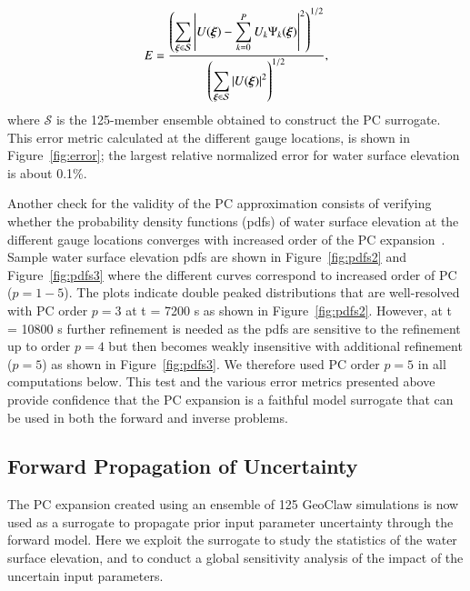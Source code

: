 \documentclass[review,12pt]{elsarticle}
\newcommand{\xxi}{\vec{\xi}}
\newcommand{\NISP}{\mathcal{S}}
\renewcommand{\vec}[1]{{\mathchoice
                     {\mbox{\boldmath$\displaystyle{#1}$}}
                     {\mbox{\boldmath$\textstyle{#1}$}}
                     {\mbox{\boldmath$\scriptstyle{#1}$}}
                     {\mbox{\boldmath$\scriptscriptstyle{#1}$}}}}
\newcommand{\geoclaw}{{\sc GeoClaw}\xspace}
\begin{document}
\begin{equation} 
   E = \frac{\displaystyle
         \left(\sum_{\xxi \in \NISP} \left|U(\xxi) - \sum_{k = 0}^{P}
U_k\Psi_k(\xxi)\right|^2
         \right)^{1/2}}
        {\displaystyle
          \left(\sum_{\xxi \in \NISP} \left|U(\xxi)\right|^2\right)^{1/2} 
          },
\label{eq:error}
\end{equation}
where $\NISP$ is the 125-member ensemble obtained to construct the PC surrogate. 
This error metric calculated at the different gauge locations, is shown in Figure~\ref{fig:error};
the largest relative normalized error for 
water surface elevation is about 0.1\%. 

Another check for the validity of the PC approximation 
consists of verifying whether the probability density
functions (pdfs) of water surface elevation at the different gauge locations
converges with increased order of the PC expansion~\cite{Alexanderian2012,sraj:2013a}.  Sample
water surface elevation pdfs are shown in Figure~\ref{fig:pdfs2}
and Figure~\ref{fig:pdfs3} where
the different curves correspond to increased order of PC ($p= 1-5$).
The plots indicate double peaked distributions that are
well-resolved with PC order $p=3$ at t = 7200 s as shown in Figure~\ref{fig:pdfs2}.
However, at t = 10800 s further refinement is needed as the pdfs are
sensitive to the refinement up to order $p=4$ but then becomes weakly 
insensitive with additional refinement  ($p = 5$) as shown in Figure~\ref{fig:pdfs3}. 
We therefore used PC order $p = 5$ in all computations below.
This test and the various error metrics presented above provide confidence that the PC expansion is a faithful 
model surrogate that can be used in both the forward and inverse problems. 

\subsection{Forward Propagation of Uncertainty}
\label{sec:forward}
The PC expansion created using an ensemble of 125 \geoclaw simulations
is now used as a surrogate to propagate prior input parameter uncertainty 
through the forward model.  Here we exploit the surrogate 
to study the statistics of the water surface elevation, and to conduct 
a global sensitivity analysis of the impact of the uncertain input parameters.
\end{document}
